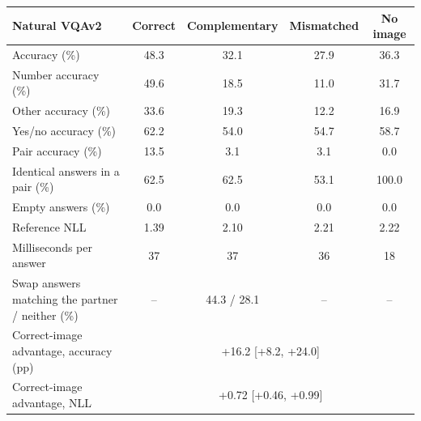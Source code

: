 \begin{tabular}{lcccc}\toprule Natural VQAv2 & Correct & Complementary & Mismatched & No image \\ \midrule
Accuracy (\%) & 48.3 & 32.1 & 27.9 & 36.3 \\
Number accuracy (\%) & 49.6 & 18.5 & 11.0 & 31.7 \\
Other accuracy (\%) & 33.6 & 19.3 & 12.2 & 16.9 \\
Yes/no accuracy (\%) & 62.2 & 54.0 & 54.7 & 58.7 \\
Pair accuracy (\%) & 13.5 & 3.1 & 3.1 & 0.0 \\
Identical answers in a pair (\%) & 62.5 & 62.5 & 53.1 & 100.0 \\
Empty answers (\%) & 0.0 & 0.0 & 0.0 & 0.0 \\
Reference NLL & 1.39 & 2.10 & 2.21 & 2.22 \\
Milliseconds per answer & 37 & 37 & 36 & 18 \\
\midrule Swap answers matching the partner / neither (\%) & -- & 44.3 / 28.1 & -- & -- \\
Correct-image advantage, accuracy (pp) & \multicolumn{4}{c}{+16.2 [+8.2, +24.0]} \\
Correct-image advantage, NLL & \multicolumn{4}{c}{+0.72 [+0.46, +0.99]} \\
\bottomrule\end{tabular}
